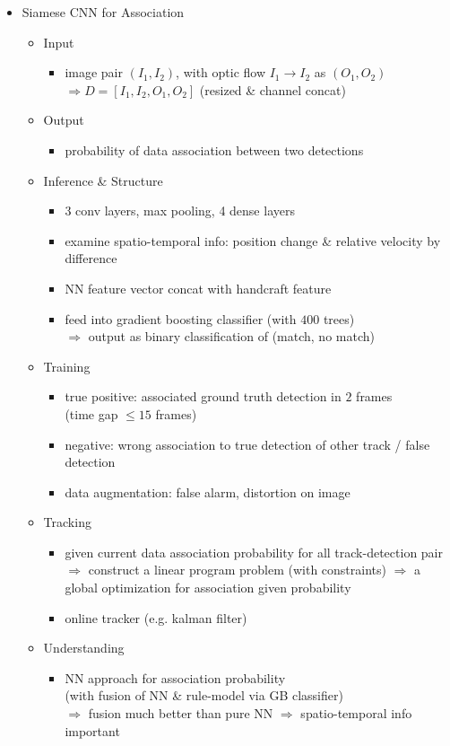\begin{itemize}
\item Siamese CNN for Association
	\begin{itemize}
	\item Input
		\begin{itemize}
		\item image pair $(I_1, I_2)$, with optic flow $I_1\rightarrow I_2$ as $(O_1,O_2)$ \\
		$\Rightarrow D = [I_1,I_2,O_1,O_2]$ (resized \& channel concat)
		\end{itemize}
	\item Output
		\begin{itemize}
		\item probability of data association between two detections
		\end{itemize}
	\item Inference \& Structure
		\begin{itemize}
		\item 3 conv layers, max pooling, 4 dense layers
		\item examine spatio-temporal info: position change \& relative velocity by difference
		\item NN feature vector concat with handcraft feature
		\item feed into gradient boosting classifier (with $400$ trees) \\ 
		$\Rightarrow$ output as binary classification of (match, no match)
		\end{itemize}
	\item Training
		\begin{itemize}
		\item true positive: associated ground truth detection in $2$ frames \\
		(time gap $\le15$ frames)
		\item negative: wrong association to true detection of other track / false detection
		\item data augmentation: false alarm, distortion on image
		\end{itemize}
	\item Tracking
		\begin{itemize}
		\item given current data association probability for all track-detection pair \\
		$\Rightarrow$ construct a linear program problem (with constraints)
		$\Rightarrow$ a global optimization for association given probability
		\item online tracker (e.g. kalman filter)
		\end{itemize}
	\item Understanding
		\begin{itemize}
		\item NN approach for association probability \\
		(with fusion of NN \& rule-model via GB classifier) \\
		$\Rightarrow$ fusion much better than pure NN $\Rightarrow$ spatio-temporal info important
		\end{itemize}
	\end{itemize}


\end{itemize}
